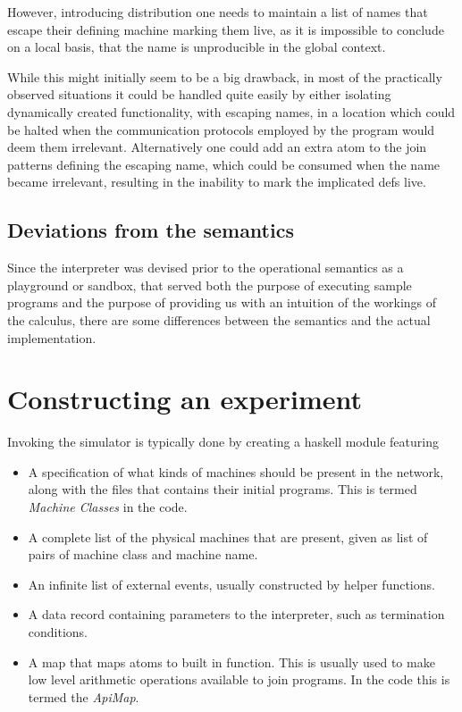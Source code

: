 However, introducing distribution one needs to maintain a list of names that
escape their defining machine marking them live, as it is impossible to
conclude on a local basis, that the name is unproducible in the global context.

While this might initially seem to be a big drawback, in most of the practically
observed situations it could be handled quite easily by either isolating
dynamically created functionality, with escaping names, in a location which
could be halted when the communication protocols employed by the program would
deem them irrelevant.  Alternatively one could add an extra atom to the join
patterns defining the escaping name, which could be consumed when the name
became irrelevant, resulting in the inability to mark the implicated defs live.

\subsection*{Deviations from the semantics}
Since the interpreter was devised prior to the operational semantics as a
playground or sandbox, that served both the purpose of executing sample programs
and the purpose of providing us with an intuition of the workings of the
calculus, there are some differences between the semantics and the actual
implementation.

\section{Constructing an experiment}
Invoking the simulator is typically done by creating a haskell module featuring
\begin{itemize}

\item A specification of what kinds of machines should be present in the
network, along with the files that contains their initial programs. This is
termed \emph{Machine Classes} in the code.

\item A complete list of the physical machines that are present, given as list
of pairs of machine class and machine name.

\item An infinite list of external events, usually constructed by helper
functions.

\item A data record containing parameters to the interpreter, such as
termination conditions.

\item A map that maps atoms to built in function. This is usually used to make
low level arithmetic operations available to join programs. In the code this is
termed the \emph{ApiMap}.

\end{itemize}

